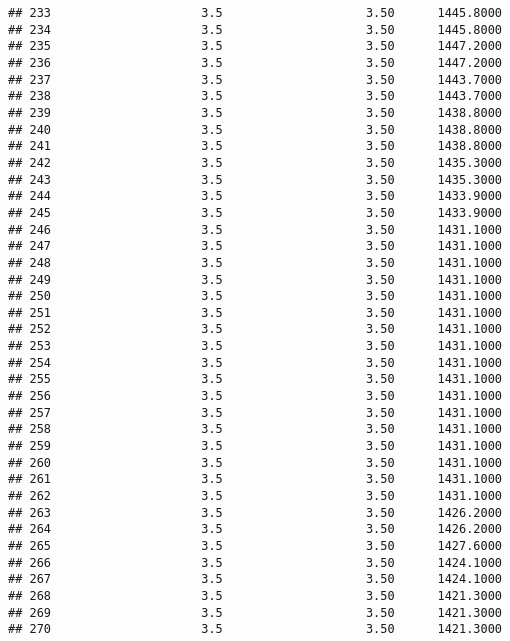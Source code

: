 \documentclass[]{article}
\begin{document}
\begin{verbatim}
## 233                     3.5                    3.50      1445.8000
## 234                     3.5                    3.50      1445.8000
## 235                     3.5                    3.50      1447.2000
## 236                     3.5                    3.50      1447.2000
## 237                     3.5                    3.50      1443.7000
## 238                     3.5                    3.50      1443.7000
## 239                     3.5                    3.50      1438.8000
## 240                     3.5                    3.50      1438.8000
## 241                     3.5                    3.50      1438.8000
## 242                     3.5                    3.50      1435.3000
## 243                     3.5                    3.50      1435.3000
## 244                     3.5                    3.50      1433.9000
## 245                     3.5                    3.50      1433.9000
## 246                     3.5                    3.50      1431.1000
## 247                     3.5                    3.50      1431.1000
## 248                     3.5                    3.50      1431.1000
## 249                     3.5                    3.50      1431.1000
## 250                     3.5                    3.50      1431.1000
## 251                     3.5                    3.50      1431.1000
## 252                     3.5                    3.50      1431.1000
## 253                     3.5                    3.50      1431.1000
## 254                     3.5                    3.50      1431.1000
## 255                     3.5                    3.50      1431.1000
## 256                     3.5                    3.50      1431.1000
## 257                     3.5                    3.50      1431.1000
## 258                     3.5                    3.50      1431.1000
## 259                     3.5                    3.50      1431.1000
## 260                     3.5                    3.50      1431.1000
## 261                     3.5                    3.50      1431.1000
## 262                     3.5                    3.50      1431.1000
## 263                     3.5                    3.50      1426.2000
## 264                     3.5                    3.50      1426.2000
## 265                     3.5                    3.50      1427.6000
## 266                     3.5                    3.50      1424.1000
## 267                     3.5                    3.50      1424.1000
## 268                     3.5                    3.50      1421.3000
## 269                     3.5                    3.50      1421.3000
## 270                     3.5                    3.50      1421.3000

\end{verbatim}
\end{document}
